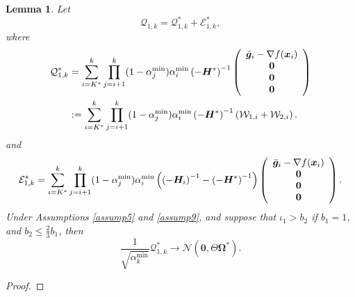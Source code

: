 \documentclass[aos]{imsart}
\numberwithin{equation}{section}
\theoremstyle{plain}
\newtheorem{lemma}{Lemma}
\begin{document}
\begin{appendix}
\begin{lemma}
\label{lemma15}
    Let
    \begin{equation*}
        \mathcal{Q}_{1,k} = \mathcal{Q}_{1,k}^{*} + \mathcal{E}_{1,k}^{*},
    \end{equation*}
    where 
    \begin{equation*}
        \begin{split}
            \mathcal{Q}_{1,k}^{*} & = \sum_{i=K^{*}}^{k} \prod_{j=i+1}^{k} (1-\alpha^{\min}_j) \alpha^{\min}_i \left(-\bm{H}^{*}\right)^{-1} \left( \begin{array}{c}
                \Bar{\bm{g}}_{i} - \nabla f(\bm{x}_i) \\
                \bm{0}\\
                \bm{0}\\
                \bm{0}\\
            \end{array}\right) \\
        & : = \sum_{i=K^{*}}^{k} \prod_{j=i+1}^{k} (1-\alpha^{\min}_j) \alpha^{\min}_i \left(-\bm{H}^{*}\right)^{-1} \left( \mathcal{W}_{1,i} + \mathcal{W}_{2,i} \right).
        \end{split}
    \end{equation*}
    and
    \begin{equation*}
        \mathcal{E}_{1,k}^{*} = \sum_{i=K^{*}}^{k} \prod_{j=i+1}^{k} (1-\alpha^{\min}_j) \alpha^{\min}_i \left(\left(-\bm{H}_{i}\right)^{-1} - \left(-\bm{H}^{*}\right)^{-1}\right) \left( \begin{array}{c}
                \Bar{\bm{g}}_{i} - \nabla f(\bm{x}_i) \\
                \bm{0}\\
                \bm{0}\\
                \bm{0}\\
            \end{array}\right).
    \end{equation*}
    Under Assumptions \ref{assump5} and  \ref{assump9}, and suppose that $\iota_1>b_2$ if $b_1=1$, and $b_2 \leq \frac{2}{3}b_1$,
    then
    \begin{equation}
    \label{eq34}
        \frac{1}{\sqrt{\alpha_k^{\text{min}}}}\mathcal{Q}_{1,k}^{*} \to \mathcal{N}\left( \bm{0}, \Theta \bm{\Omega}^{*} \right).
    \end{equation}
\end{lemma}



\begin{proof}


\end{proof}
\end{appendix}
\end{document}
